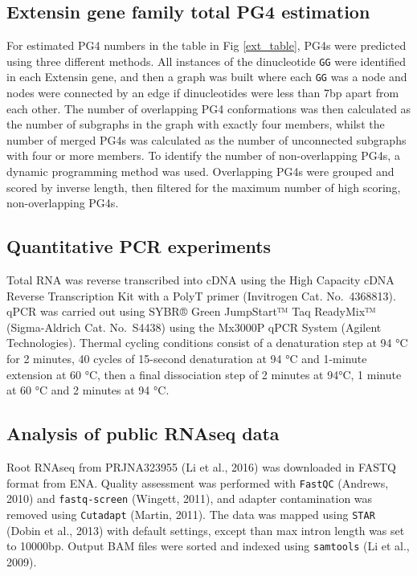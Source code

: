 \documentclass[12pt,a4paper,]{report}
\begin{document}
\hypertarget{extensin-gene-family-total-pg4-estimation}{%
\subsection{Extensin gene family total PG4
estimation}\label{extensin-gene-family-total-pg4-estimation}}

For estimated PG4 numbers in the table in Fig \ref{ext_table}, PG4s were
predicted using three different methods. All instances of the
dinucleotide \texttt{GG} were identified in each Extensin gene, and then
a graph was built where each \texttt{GG} was a node and nodes were
connected by an edge if dinucleotides were less than 7bp apart from each
other. The number of overlapping PG4 conformations was then calculated
as the number of subgraphs in the graph with exactly four members,
whilst the number of merged PG4s was calculated as the number of
unconnected subgraphs with four or more members. To identify the number
of non-overlapping PG4s, a dynamic programming method was used.
Overlapping PG4s were grouped and scored by inverse length, then
filtered for the maximum number of high scoring, non-overlapping PG4s.

\hypertarget{quantitative-pcr-experiments}{%
\subsection{Quantitative PCR
experiments}\label{quantitative-pcr-experiments}}

Total RNA was reverse transcribed into cDNA using the High Capacity cDNA
Reverse Transcription Kit with a PolyT primer (Invitrogen Cat.
No.~4368813). qPCR was carried out using SYBR® Green JumpStart™ Taq
ReadyMix™ (Sigma-Aldrich Cat. No.~S4438) using the Mx3000P qPCR System
(Agilent Technologies). Thermal cycling conditions consist of a
denaturation step at 94 °C for 2 minutes, 40 cycles of 15-second
denaturation at 94 °C and 1-minute extension at 60 °C, then a final
dissociation step of 2 minutes at 94°C, 1 minute at 60 °C and 2 minutes
at 94 °C.

\hypertarget{analysis-of-public-rnaseq-data}{%
\subsection{Analysis of public RNAseq
data}\label{analysis-of-public-rnaseq-data}}

Root RNAseq from PRJNA323955 (Li et al., 2016) was downloaded in FASTQ
format from ENA. Quality assessment was performed with \texttt{FastQC}
(Andrews, 2010) and \texttt{fastq-screen} (Wingett, 2011), and adapter
contamination was removed using \texttt{Cutadapt} (Martin, 2011). The
data was mapped using \texttt{STAR} (Dobin et al., 2013) with default
settings, except than max intron length was set to 10000bp. Output BAM
files were sorted and indexed using \texttt{samtools} (Li et al., 2009).
\end{document}
